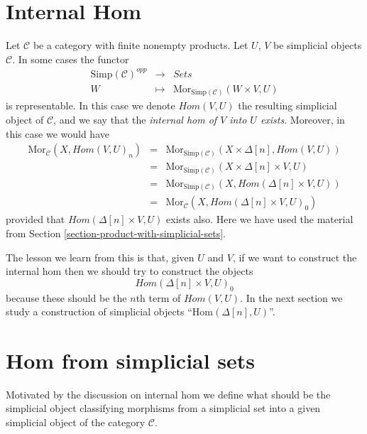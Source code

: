 \section{Internal Hom}
\label{section-internal-hom}

\noindent
Let $\mathcal{C}$ be a category with finite nonempty
products. Let $U$, $V$ be simplicial objects $\mathcal{C}$.
In some cases the functor
\begin{eqnarray*}
\text{Simp}(\mathcal{C})^{opp} & \longrightarrow & \textit{Sets} \\
W & \longmapsto & \text{Mor}_{\text{Simp}(\mathcal{C})}(W \times V, U)
\end{eqnarray*}
is representable. In this case we denote $\textit{Hom}(V, U)$
the resulting simplicial object of $\mathcal{C}$, and we say
that the {\it internal hom of $V$ into $U$ exists}. Moreover,
in this case we would have
\begin{eqnarray*}
\text{Mor}_{\mathcal{C}}(X, \textit{Hom}(V, U)_n)
& = &
\text{Mor}_{\text{Simp}(\mathcal{C})}(X \times \Delta[n], \textit{Hom}(V, U))
\\
& = &
\text{Mor}_{\text{Simp}(\mathcal{C})}(X \times \Delta[n]\times V, U) \\
& = &
\text{Mor}_{\text{Simp}(\mathcal{C})}(X, \textit{Hom}(\Delta[n] \times V, U))
\\
& = &
\text{Mor}_{\mathcal{C}}(X, \textit{Hom}(\Delta[n] \times V, U)_0)
\end{eqnarray*}
provided that $\textit{Hom}(\Delta[n] \times V, U)$
exists also. Here we have used the material from Section
\ref{section-product-with-simplicial-sets}.

\medskip\noindent
The lesson we learn from this is that, given $U$ and $V$,
if we want to construct the internal hom then we should try to  
construct the objects
$$
\textit{Hom}(\Delta[n] \times V, U)_0
$$
because these should be the $n$th term of $\textit{Hom}(V, U)$.
In the next section we study a construction of simplicial objects
``$\text{Hom}(\Delta[n], U)$''.


\section{Hom from simplicial sets}
\label{section-hom-from-simplicial-sets}

\noindent
Motivated by the discussion on internal hom we define
what should be the simplicial object classifying
morphisms from a simplicial set into a given
simplicial object of the category $\mathcal{C}$.

